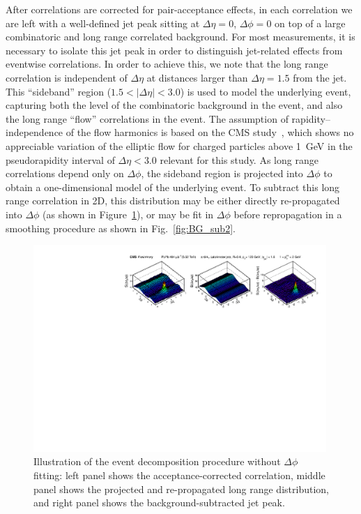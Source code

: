 After correlations are corrected for pair-acceptance effects, in each correlation we are left with a well-defined jet peak sitting at $\Delta\eta = 0$, $\Delta\phi = 0$ on top of a large combinatoric and long range correlated background.  For most measurements, it is necessary to isolate this jet peak in order to distinguish jet-related effects from eventwise correlations.   In order to achieve this, we note that the long range correlation is independent of $\Delta\eta$ at distances larger than $\Delta\eta = 1.5$ from the jet.  This ``sideband'' region ($1.5 < |\Delta\eta| < 3.0$) is used to model the underlying event, capturing both the level of the combinatoric background in the event, and also the long range ``flow'' correlations in the event.  The assumption of rapidity--independence of the flow harmonics is based on the CMS study~\cite{v2_HIN_11_012}, which shows no appreciable variation of the elliptic flow for charged particles above 1~GeV in the pseudorapidity interval of $\Delta\eta < 3.0$ relevant for this study.  As long range correlations depend only on $\Delta\phi$, the sideband region is projected into $\Delta\phi$ to obtain a one-dimensional model of the underlying event.   To subtract this long range correlation in 2D, this distribution may be either directly re-propagated into $\Delta\phi$ (as shown in Figure~\ref{fig:BG_sub1}), or may be fit in $\Delta\phi$ before repropagation in a smoothing procedure as shown in Fig.~\ref{fig:BG_sub2}.

\begin{figure}[t!] 
\begin{center} 
\includegraphics[width=0.99\textwidth]{figures/Results/Background_Subtraction.pdf}
\caption[Illustration of the event decomposition procedure without $\Delta\phi$ fitting]{Illustration of the event decomposition procedure without $\Delta\phi$ fitting:  left panel shows the acceptance-corrected correlation, middle panel shows the projected and re-propagated long range distribution, and right panel shows the background-subtracted jet peak.}
\label{fig:BG_sub1}
\end{center} 
\end{figure}

